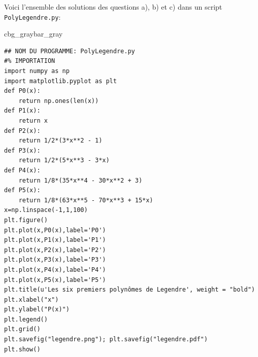 \documentclass[%
oneside,                 %
final,                   %
10pt,french]{article}
\newenvironment{_pro_tight}[2]{
   \def\FrameCommand{\color{#2}\vrule width 1mm\normalcolor\colorbox{#1}}
   \FrameRule0.6pt\MakeFramed {\advance\hsize-2mm\FrameRestore}\vskip3mm}
   {\vskip0mm\endMakeFramed}
\newenvironment{pro}[2]{
\bgroup\rmfamily
\fboxsep=0mm\relax
\begin{_pro_tight}{#1}{#2}
\list{}{\parsep=-2mm\parskip=0mm\topsep=0pt\leftmargin=2mm
\rightmargin=2\leftmargin\leftmargin=4pt\relax}
\item\relax}
{\endlist\end{_pro_tight}\egroup}
\newenvironment{noticeshaded}
{\def\FrameCommand{\fboxsep=3mm\colorbox{grayicon_notice_background}}
 \MakeFramed {\advance\hsize-\width \FrameRestore}}{\endMakeFramed}
\newenvironment{notice_grayiconadmon}[1][À noter]{
\begin{noticeshaded}
\noindent
\begin{figure}
\vspace{-13pt}
\texttt{[image: latex\_figs/small\_gray\_notice]}
\end{figure} \textbf{#1}\par
\nobreak\noindent\ignorespaces
}
{
\end{noticeshaded}
}
\newenvironment{doconceexercise}{}{}
\begin{document}
\begin{doconceexercise}
\begin{notice_grayiconadmon}[À noter]
Voici l'ensemble des solutions des questions a), b) et c) dans un script \texttt{PolyLegendre.py}:
\begin{pro}{cbg_gray}{bar_gray}\begin{verbatim}
## NOM DU PROGRAMME: PolyLegendre.py
#% IMPORTATION
import numpy as np
import matplotlib.pyplot as plt
def P0(x):
    return np.ones(len(x))
def P1(x):
    return x
def P2(x):
    return 1/2*(3*x**2 - 1)
def P3(x):
    return 1/2*(5*x**3 - 3*x)
def P4(x):
    return 1/8*(35*x**4 - 30*x**2 + 3)
def P5(x):
    return 1/8*(63*x**5 - 70*x**3 + 15*x)
x=np.linspace(-1,1,100)
plt.figure()
plt.plot(x,P0(x),label='P0')
plt.plot(x,P1(x),label='P1')
plt.plot(x,P2(x),label='P2')
plt.plot(x,P3(x),label='P3')
plt.plot(x,P4(x),label='P4')
plt.plot(x,P5(x),label='P5')
plt.title(u'Les six premiers polynômes de Legendre', weight = "bold")
plt.xlabel("x")
plt.ylabel("P(x)")
plt.legend()
plt.grid()
plt.savefig("legendre.png"); plt.savefig("legendre.pdf")
plt.show()
\end{verbatim}
\end{pro}
\noindent
\end{notice_grayiconadmon} %




\end{doconceexercise}



\end{document}

